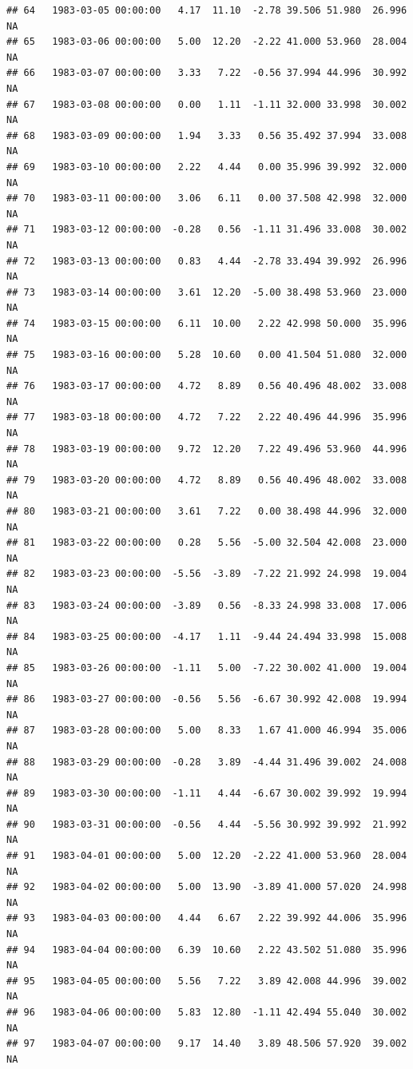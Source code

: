 \documentclass{article}\usepackage{graphicx, color}
\makeatletter
\newenvironment{kframe}{%
 \def\at@end@of@kframe{}%
 \ifinner\ifhmode%
  \def\at@end@of@kframe{\end{minipage}}%
  \begin{minipage}{\columnwidth}%
 \fi\fi%
 \def\FrameCommand##1{\hskip\@totalleftmargin \hskip-\fboxsep
 \colorbox{shadecolor}{##1}\hskip-\fboxsep
     \hskip-\linewidth \hskip-\@totalleftmargin \hskip\columnwidth}%
 \MakeFramed {\advance\hsize-\width
   \@totalleftmargin\z@ \linewidth\hsize
   \@setminipage}}%
 {\par\unskip\endMakeFramed%
 \at@end@of@kframe}
\newenvironment{knitrout}{}{} %
\makeatother
\begin{document}
\begin{knitrout}
\begin{kframe}
\begin{verbatim}
## 64   1983-03-05 00:00:00   4.17  11.10  -2.78 39.506 51.980  26.996     NA
## 65   1983-03-06 00:00:00   5.00  12.20  -2.22 41.000 53.960  28.004     NA
## 66   1983-03-07 00:00:00   3.33   7.22  -0.56 37.994 44.996  30.992     NA
## 67   1983-03-08 00:00:00   0.00   1.11  -1.11 32.000 33.998  30.002     NA
## 68   1983-03-09 00:00:00   1.94   3.33   0.56 35.492 37.994  33.008     NA
## 69   1983-03-10 00:00:00   2.22   4.44   0.00 35.996 39.992  32.000     NA
## 70   1983-03-11 00:00:00   3.06   6.11   0.00 37.508 42.998  32.000     NA
## 71   1983-03-12 00:00:00  -0.28   0.56  -1.11 31.496 33.008  30.002     NA
## 72   1983-03-13 00:00:00   0.83   4.44  -2.78 33.494 39.992  26.996     NA
## 73   1983-03-14 00:00:00   3.61  12.20  -5.00 38.498 53.960  23.000     NA
## 74   1983-03-15 00:00:00   6.11  10.00   2.22 42.998 50.000  35.996     NA
## 75   1983-03-16 00:00:00   5.28  10.60   0.00 41.504 51.080  32.000     NA
## 76   1983-03-17 00:00:00   4.72   8.89   0.56 40.496 48.002  33.008     NA
## 77   1983-03-18 00:00:00   4.72   7.22   2.22 40.496 44.996  35.996     NA
## 78   1983-03-19 00:00:00   9.72  12.20   7.22 49.496 53.960  44.996     NA
## 79   1983-03-20 00:00:00   4.72   8.89   0.56 40.496 48.002  33.008     NA
## 80   1983-03-21 00:00:00   3.61   7.22   0.00 38.498 44.996  32.000     NA
## 81   1983-03-22 00:00:00   0.28   5.56  -5.00 32.504 42.008  23.000     NA
## 82   1983-03-23 00:00:00  -5.56  -3.89  -7.22 21.992 24.998  19.004     NA
## 83   1983-03-24 00:00:00  -3.89   0.56  -8.33 24.998 33.008  17.006     NA
## 84   1983-03-25 00:00:00  -4.17   1.11  -9.44 24.494 33.998  15.008     NA
## 85   1983-03-26 00:00:00  -1.11   5.00  -7.22 30.002 41.000  19.004     NA
## 86   1983-03-27 00:00:00  -0.56   5.56  -6.67 30.992 42.008  19.994     NA
## 87   1983-03-28 00:00:00   5.00   8.33   1.67 41.000 46.994  35.006     NA
## 88   1983-03-29 00:00:00  -0.28   3.89  -4.44 31.496 39.002  24.008     NA
## 89   1983-03-30 00:00:00  -1.11   4.44  -6.67 30.002 39.992  19.994     NA
## 90   1983-03-31 00:00:00  -0.56   4.44  -5.56 30.992 39.992  21.992     NA
## 91   1983-04-01 00:00:00   5.00  12.20  -2.22 41.000 53.960  28.004     NA
## 92   1983-04-02 00:00:00   5.00  13.90  -3.89 41.000 57.020  24.998     NA
## 93   1983-04-03 00:00:00   4.44   6.67   2.22 39.992 44.006  35.996     NA
## 94   1983-04-04 00:00:00   6.39  10.60   2.22 43.502 51.080  35.996     NA
## 95   1983-04-05 00:00:00   5.56   7.22   3.89 42.008 44.996  39.002     NA
## 96   1983-04-06 00:00:00   5.83  12.80  -1.11 42.494 55.040  30.002     NA
## 97   1983-04-07 00:00:00   9.17  14.40   3.89 48.506 57.920  39.002     NA

\end{verbatim}
\end{kframe}
\end{knitrout}
\end{document}

